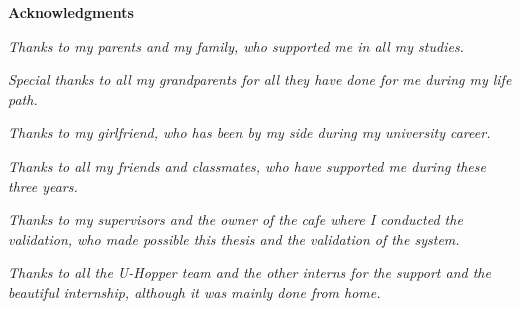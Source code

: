 \thispagestyle{empty}

\begin{center}
  {\bf \Huge Acknowledgments}
\end{center}

\vspace{4cm}

\emph{ Thanks to my parents and my family, who supported me in all my studies. }

\emph{ Special thanks to all my grandparents for all they have done for me during my life path. }

\emph{ Thanks to my girlfriend, who has been by my side during my university career. }

\emph{ Thanks to all my friends and classmates, who have supported me during these three years. }

\emph{ Thanks to my supervisors and the owner of the cafe where I conducted the validation, who made possible this thesis and the validation of the system. }

\emph{ Thanks to all the U-Hopper team and the other interns for the support and the beautiful internship, although it was mainly done from home. }

